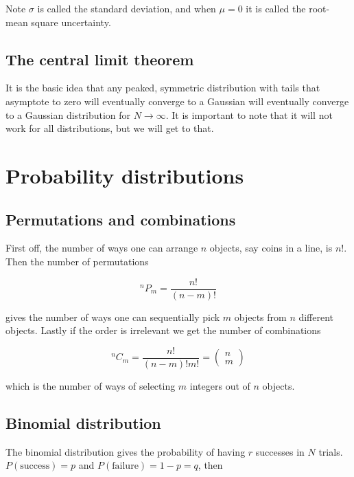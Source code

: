 \documentclass[a4paper]{article}
\begin{document}
Note $\sigma$ is called the standard deviation, and when $\mu=0$ it is called the root-mean square uncertainty.

\subsection{The central limit theorem}

It is the basic idea that any peaked, symmetric distribution with tails that asymptote to zero will eventually converge to a Gaussian will eventually converge to a Gaussian distribution for $N\rightarrow\infty$. It is important to note that it will not work for all distributions, but we will get to that.

\section{Probability distributions}

\subsection{Permutations and combinations}

First off, the number of ways one can arrange $n$ objects, say coins in a line, is $n!$. Then the number of permutations

\begin{equation}
	{}^nP_m=\frac{n!}{(n-m)!}
\end{equation}

gives the number of ways one can sequentially pick $m$ objects from $n$ different objects. Lastly if the order is irrelevant we get the number of combinations

\begin{equation}
	{}^nC_m=\frac{n!}{(n-m)!m!}=\begin{pmatrix}
	n\\ m
	\end{pmatrix}
\end{equation}

which is the number of ways of selecting $m$ integers out of $n$ objects.

\subsection{Binomial distribution}

The binomial distribution gives the probability of having $r$ successes in $N$ trials. $P(\text{success})=p$ and $P(\text{failure})=1-p=q$, then
\end{document}
